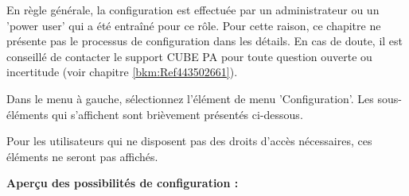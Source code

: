 En règle générale, la configuration est effectuée par un administrateur ou un 'power user' qui a été entraîné pour ce rôle. Pour cette raison, ce chapitre ne présente pas le processus de configuration dans les détails. En cas de doute, il est conseillé de contacter le support CUBE PA pour toute question ouverte ou incertitude (voir chapitre \ref{bkm:Ref443502661}).

\vspace{\baselineskip}

Dans le menu à gauche, sélectionnez l'élément de menu 'Configuration'. Les sous-éléments qui s'affichent sont brièvement présentés ci-dessous.

\vspace{1.5cm} 

Pour les utilisateurs qui ne disposent pas des droits d'accès nécessaires, ces éléments ne seront pas affichés. \\

\vspace{3.5cm}  

\textbf{Aperçu des possibilités de configuration :}

\vspace{\baselineskip}


